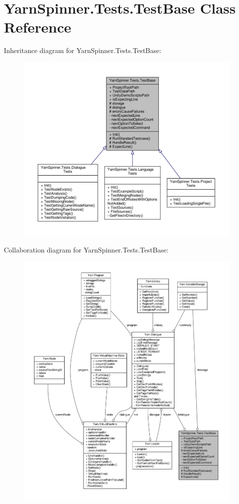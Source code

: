\hypertarget{a00152}{\section{Yarn\-Spinner.\-Tests.\-Test\-Base Class Reference}
\label{a00152}
}


Inheritance diagram for Yarn\-Spinner.\-Tests.\-Test\-Base\-:
\nopagebreak
\begin{figure}[H]
\begin{center}
\leavevmode
\includegraphics[width=350pt]{a00731}
\end{center}
\end{figure}


Collaboration diagram for Yarn\-Spinner.\-Tests.\-Test\-Base\-:
\nopagebreak
\begin{figure}[H]
\begin{center}
\leavevmode
\includegraphics[width=350pt]{a00732}
\end{center}
\end{figure}
